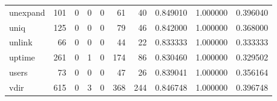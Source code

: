\begin{tabular}{lrrrrrrrrr}
unexpand  &                                   101 &                                                  0 &                                                  0 &                                                  0 &                                                 61 &                                                 40 &                                           0.849010 &                               1.000000 &                             0.396040 \\
uniq      &                                   125 &                                                  0 &                                                  0 &                                                  0 &                                                 79 &                                                 46 &                                           0.842000 &                               1.000000 &                             0.368000 \\
unlink    &                                    66 &                                                  0 &                                                  0 &                                                  0 &                                                 44 &                                                 22 &                                           0.833333 &                               1.000000 &                             0.333333 \\
uptime    &                                   261 &                                                  0 &                                                  1 &                                                  0 &                                                174 &                                                 86 &                                           0.830460 &                               1.000000 &                             0.329502 \\
users     &                                    73 &                                                  0 &                                                  0 &                                                  0 &                                                 47 &                                                 26 &                                           0.839041 &                               1.000000 &                             0.356164 \\
vdir      &                                   615 &                                                  0 &                                                  3 &                                                  0 &                                                368 &                                                244 &                                           0.846748 &                               1.000000 &                             0.396748 \\

\end{tabular}
